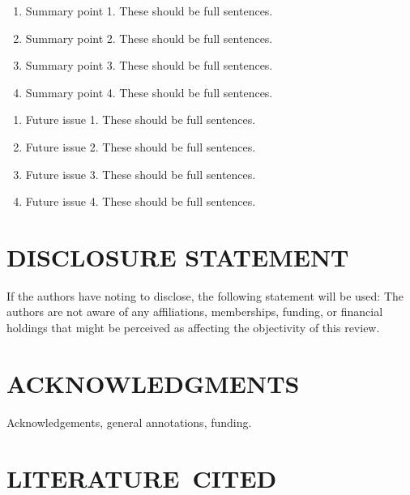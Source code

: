 \documentclass[a4paper]{ar-1col}
\begin{document}
\begin{summary}
\begin{enumerate}
\item Summary point 1. These should be full sentences.
\item Summary point 2. These should be full sentences.
\item Summary point 3. These should be full sentences.
\item Summary point 4. These should be full sentences.
\end{enumerate}
\end{summary}

\begin{issues}
\begin{enumerate}
\item Future issue 1. These should be full sentences.
\item Future issue 2. These should be full sentences.
\item Future issue 3. These should be full sentences.
\item Future issue 4. These should be full sentences.
\end{enumerate}
\end{issues}

\section*{DISCLOSURE STATEMENT}
If the authors have noting to disclose, the following statement will be used: The authors are not aware of any affiliations, memberships, funding, or financial holdings that
might be perceived as affecting the objectivity of this review. 

\section*{ACKNOWLEDGMENTS}
Acknowledgements, general annotations, funding.

%
\section*{LITERATURE\ CITED}

\end{document}
